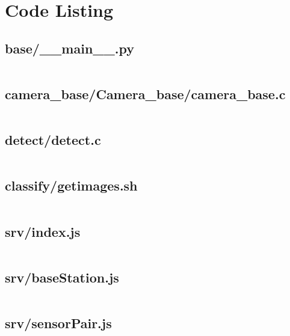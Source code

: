 \chapter{Code Listing}

\section{base/\_\_main\_\_.py}
\label{code:base-main}
\inputminted{python}{../base/__main__.py}

\section{camera\_base/Camera\_base/camera\_base.c}
\label{code:camera-base}
\inputminted{c}{../camera_base/Camera_base/camera_base.c}

\section{detect/detect.c}
\label{code:detect}
\inputminted{c}{../detect/detect.c}


\section{classify/getimages.sh}
\label{code:classify-getimages}
\inputminted[linenos]{bash}{../classify/getimages.sh}

\section{srv/index.js}
\label{code:srv-index}
\inputminted{javascript}{../srv/index.js}

\section{srv/baseStation.js}
\label{code:srv-basestation-api}
\inputminted{javascript}{../srv/baseStation.js}

\section{srv/sensorPair.js}
\label{code:srv-sensorpair-api}
\inputminted{javascript}{../srv/sensorPair.js}

